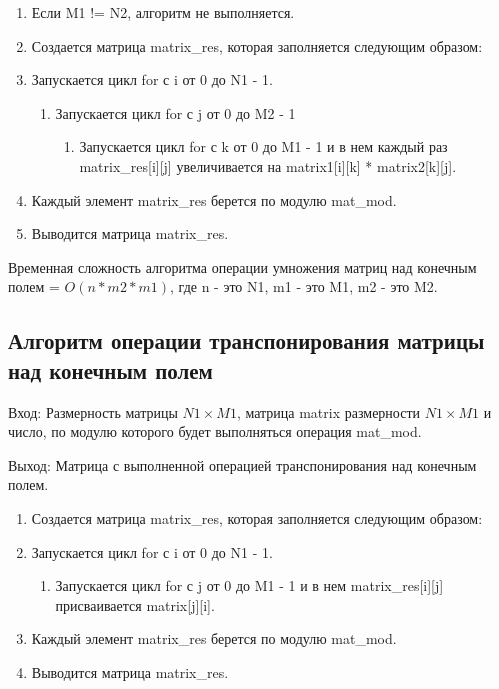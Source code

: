 \documentclass[bachelor, och, labwork]{shiza}
\begin{document}
	\begin{enumerate} 
		\item Если M1 != N2, алгоритм не выполняется.
		\item Создается матрица matrix\_res, которая заполняется следующим образом:
		\item Запускается цикл for с i от 0 до N1 - 1.
		\begin{enumerate} 
			\item Запускается цикл for с j от 0 до M2 - 1
			\begin{enumerate} 
				\item Запускается цикл for с k от 0 до M1 - 1 и в нем каждый раз matrix\_res[i][j] увеличивается на
				matrix1[i][k] * matrix2[k][j].
			\end{enumerate}
		\end{enumerate}
		\item Каждый элемент matrix\_res берется по модулю mat\_mod.
		\item Выводится матрица matrix\_res.
	\end{enumerate} 
	
	Временная сложность алгоритма операции умножения матриц над конечным полем = $O(n * m2 * m1)$, где n - это N1, m1 - это M1, m2 - это M2.

	\subsection{Алгоритм операции транспонирования матрицы над конечным полем}
	
			$\textit{Вход:}$ Размерность матрицы $N1 \times M1$, матрица matrix размерности $N1 \times M1$ и число, по модулю которого будет выполняться операция mat\_mod.

			$\textit{Выход:}$  Матрица с выполненной операцией транспонирования над конечным полем.		
	
	\begin{enumerate} 
		\item Создается матрица matrix\_res, которая заполняется следующим образом:
		\item Запускается цикл for с i от 0 до N1 - 1.
		\begin{enumerate} 
			\item Запускается цикл for с j от 0 до M1 - 1 и в нем   matrix\_res[i][j] присваивается matrix[j][i].
		\end{enumerate}
		\item Каждый элемент matrix\_res берется по модулю mat\_mod.
		\item Выводится матрица matrix\_res.
	\end{enumerate} 
	
\end{document}
